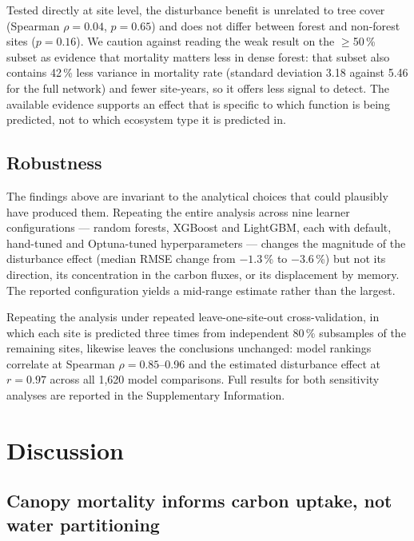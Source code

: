 \documentclass[pdflatex,sn-nature]{sn-jnl}%
\theoremstyle{thmstyleone}%
\theoremstyle{thmstyletwo}%
\theoremstyle{thmstylethree}%
\begin{document}
Tested directly at site level, the disturbance benefit is unrelated to tree cover (Spearman $\rho = 0.04$, $p = 0.65$) and does not differ between forest and non-forest sites ($p = 0.16$). We caution against reading the weak result on the $\geq$50\,\% subset as evidence that mortality matters less in dense forest: that subset also contains 42\,\% less variance in mortality rate (standard deviation 3.18 against 5.46 for the full network) and fewer site-years, so it offers less signal to detect. The available evidence supports an effect that is specific to which function is being predicted, not to which ecosystem type it is predicted in.

\subsection{Robustness}

The findings above are invariant to the analytical choices that could plausibly have produced them. Repeating the entire analysis across nine learner configurations --- random forests, XGBoost and LightGBM, each with default, hand-tuned and Optuna-tuned hyperparameters --- changes the magnitude of the disturbance effect (median RMSE change from $-1.3$\,\% to $-3.6$\,\%) but not its direction, its concentration in the carbon fluxes, or its displacement by memory. The reported configuration yields a mid-range estimate rather than the largest.

Repeating the analysis under repeated leave-one-site-out cross-validation, in which each site is predicted three times from independent 80\,\% subsamples of the remaining sites, likewise leaves the conclusions unchanged: model rankings correlate at Spearman $\rho = 0.85$--0.96 and the estimated disturbance effect at $r = 0.97$ across all 1{,}620 model comparisons. Full results for both sensitivity analyses are reported in the Supplementary Information.

\section{Discussion}\label{sec12}

\subsection{Canopy mortality informs carbon uptake, not water partitioning}
\end{document}
